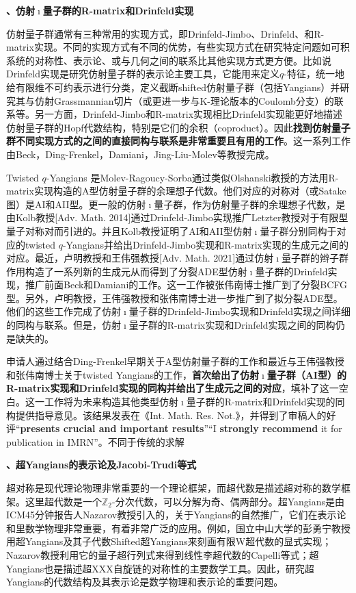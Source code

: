 \documentclass[12pt,UTF8,AutoFakeBold=4,a4paper]{ctexart}
\begin{document}
\medskip

\textbf{、仿射$\imath$量子群的R-matrix和Drinfeld实现}

仿射量子群通常有三种常用的实现方式，即Drinfeld-Jimbo、Drinfeld、和R-matrix实现。不同的实现方式有不同的优势，有些实现方式在研究特定问题如可积系统的对称性、表示论、或与几何之间的联系比其他实现方式更方便。比如说Drinfeld实现是研究仿射量子群的表示论主要工具，它能用来定义$q$-特征，统一地给有限维不可约表示进行分类，定义截断shifted仿射量子群（包括Yangians）并研究其与仿射Grassmannian切片（或更进一步与K-理论版本的Coulomb分支）的联系等。另一方面，Drinfeld-Jimbo和R-matrix实现相比Drinfeld实现能更好地描述仿射量子群的Hopf代数结构，特别是它们的余积（coproduct）。因此\textbf{找到仿射量子群不同实现方式的之间的直接同构与联系是非常重要且有用的工作}。这一系列工作由Beck，Ding-Frenkel，Damiani，Jing-Liu-Molev等教授完成。

Twisted $q$-Yangians 是Molev-Ragoucy-Sorba通过类似Olshanski教授的方法用R-matrix实现构造的A型仿射量子群的余理想子代数。他们对应的对称对（或Satake图）是AI和AII型。更一般的仿射$\imath$量子群，作为仿射量子群的余理想子代数，是由Kolb教授[Adv. Math. 2014]通过Drinfeld-Jimbo实现推广Letzter教授对于有限型量子对称对而引进的。并且Kolb教授证明了AI和AII型仿射$\imath$量子群分别同构于对应的twisted $q$-Yangians并给出Drinfeld-Jimbo实现和R-matrix实现的生成元之间的对应。最近，卢明教授和王伟强教授[Adv. Math. 2021]通过仿射$\imath$量子群的辫子群作用构造了一系列新的生成元从而得到了分裂ADE型仿射$\imath$量子群的Drinfeld实现，推广前面Beck和Damiani的工作。这一工作被张伟南博士推广到了分裂BCFG型。另外，卢明教授，王伟强教授和张伟南博士进一步推广到了拟分裂ADE型。他们的这些工作完成了仿射$\imath$量子群的Drinfeld-Jimbo实现和Drinfeld实现之间详细的同构与联系。但是，仿射$\imath$量子群的R-matrix实现和Drinfeld实现之间的同构仍是缺失的。

申请人通过结合Ding-Frenkel早期关于A型仿射量子群的工作和最近与王伟强教授和张伟南博士关于twisted Yangians的工作，\textbf{首次给出了仿射$\imath$量子群（AI型）的R-matrix实现和Drinfeld实现的同构并给出了生成元之间的对应}，填补了这一空白。这一工作将为未来构造其他类型仿射$\imath$量子群的R-matrix和Drinfeld实现的同构提供指导意见。该结果发表在《Int. Math. Res. Not.》，并得到了审稿人的好评“\textbf{presents crucial and important results}”“I \textbf{strongly recommend} it for publication in IMRN”。不同于传统的求解

\medskip

\textbf{、超Yangians的表示论及Jacobi-Trudi等式}

超对称是现代理论物理非常重要的一个理论框架，而超代数是描述超对称的数学框架。这里超代数是一个$\mathbb Z_2$-分次代数，可以分解为奇、偶两部分。超Yangians是由ICM45分钟报告人Nazarov教授引入的，关于Yangians的自然推广，它们在表示论和里数学物理非常重要，有着非常广泛的应用。例如，国立中山大学的彭勇宁教授用超Yangians及其子代数Shifted超Yangians来刻画有限W超代数的显式实现；Nazarov教授利用它的量子超行列式来得到线性李超代数的Capelli等式；超Yangians也是描述超XXX自旋链的对称性的主要数学工具。因此，研究超Yangians的代数结构及其表示论是数学物理和表示论的重要问题。
\end{document}
